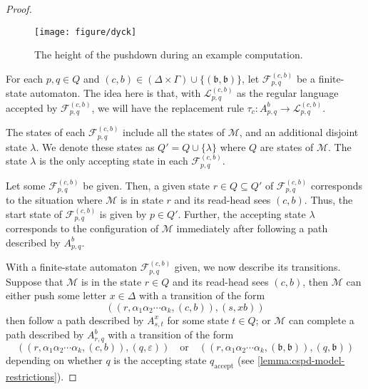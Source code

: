 \begin{proof}
	\begin{figure}[!ht]
		\centering
		\texttt{[image: figure/dyck]}
		\caption{The height of the pushdown during an example computation.}%
		\label{fig:cspd dyck path}
	\end{figure}
	
	
	For each $p,q \in Q$ and $(c,b) \in (\Delta\times \Gamma)\cup\{(\mathfrak{b},\mathfrak{b})\}$, let $\mathcal{F}_{p,q}^{(c,b)}$ be a finite-state automaton.
	The idea here is that, with $\mathcal{L}_{p,q}^{(c,b)}$ as the regular language accepted by $\mathcal{F}_{p,q}^{(c,b)}$, we will have the replacement rule $\tau_c \colon A_{p,q}^{b} \to \mathcal{L}_{p,q}^{(c,b)}$.
	
	The states of each $\mathcal{F}_{p,q}^{(c,b)}$ include all the states of $\mathcal{M}$, and an additional disjoint state $\lambda$.
	We denote these states as $Q' = Q \cup \{\lambda\}$ where $Q$ are states of $\mathcal{M}$.
	The state $\lambda$ is the only accepting state in each $\mathcal{F}_{p,q}^{(c,b)}$.
	
	Let some $\mathcal{F}_{p,q}^{(c,b)}$ be given.
	Then, a given state $r \in Q \subseteq Q'$ of $\mathcal{F}_{p,q}^{(c,b)}$ corresponds to the situation where $\mathcal{M}$ is in state $r$ and its read-head sees $(c,b)$.
	Thus, the start state of $\mathcal{F}_{p,q}^{(c,b)}$ is given by $p\in Q'$.
	Further, the accepting state $\lambda$ corresponds to the configuration of $\mathcal{M}$ immediately after following a path described by $A_{p,q}^b$.
	
	With a finite-state automaton $\mathcal{F}_{p,q}^{(c,b)}$ given, we now describe its transitions.
	Suppose that $\mathcal{M}$ is in the state $r \in Q$ and its read-head sees $(c,b)$,
	then $\mathcal{M}$ can either push some letter $x \in \Delta$ with a transition of the form
	\begin{equation}\label{eq:transition 1}
		(
		(r, \alpha_1 \alpha_2 \cdots \alpha_k, (c,b)),
		(s,xb)
		)
	\end{equation}
	then follow a path described by $A_{s,t}^{x}$ for some state $t\in Q$;
	or $\mathcal{M}$ can complete a path described by $A_{r,q}^b$ with a transition of the form
	\begin{equation}\label{eq:transition 2}
		(
		(r, \alpha_1 \alpha_2 \cdots \alpha_k, (c,b)),
		(q,\varepsilon)
		)
		\quad
		\text{or}
		\quad
		(
		(r, \alpha_1 \alpha_2 \cdots \alpha_k, (\mathfrak{b},\mathfrak{b})),
		(q, \mathfrak{b})
		)
	\end{equation}
	depending on whether $q$ is the accepting state $q_\mathrm{accept}$ (see \cref{lemma:cspd-model-restrictions}).
	

\end{proof}
